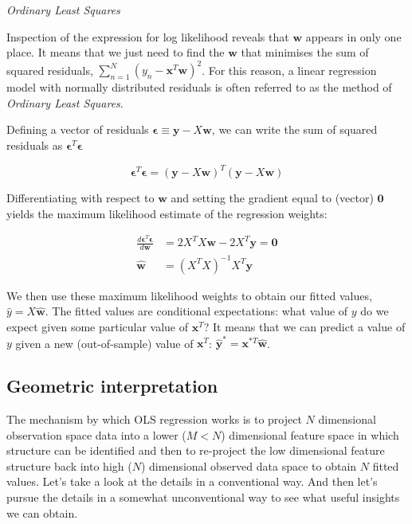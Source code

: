 \documentclass[11pt]{article}
\begin{document}
	\emph{Ordinary Least Squares}
	
	Inspection of the expression for log likelihood reveals that $\boldsymbol{w}$ appears in only one place. It means that we just need to find the $\boldsymbol{w}$ that minimises the sum of squared residuals, $\sum_{n=1}^{N} (y_{n} - \boldsymbol{x}^{T}\boldsymbol{w})^{2}$. For this reason, a linear regression model with normally distributed residuals is often referred to as the method of \emph{Ordinary Least Squares}.
	
	Defining a vector of residuals $\boldsymbol{\epsilon} \equiv \boldsymbol{y} - X\boldsymbol{w}$, we can write the sum of squared residuals as $\boldsymbol{\epsilon}^{T}\boldsymbol{\epsilon}$
	
	\begin{equation*}
		\boldsymbol{\epsilon}^{T}\boldsymbol{\epsilon} = (\boldsymbol{y} - X\boldsymbol{w})^{T}(\boldsymbol{y} - X\boldsymbol{w})
	\end{equation*}
	
	Differentiating with respect to $\boldsymbol{w}$ and setting the gradient equal to (vector) $\boldsymbol{0}$ yields the maximum likelihood estimate of the regression weights:
	
	\begin{align*}
		\frac {d \boldsymbol{\epsilon}^{T}\boldsymbol{\epsilon}}{d\boldsymbol{w}} &= 2X^{T}X\boldsymbol{w} -2X^{T}\boldsymbol{y} = \boldsymbol{0} \\
		\boldsymbol{\hat{w}} &= (X^{T}X)^{-1}X^{T}\boldsymbol{y}
	\end{align*}
	
	We then use these maximum likelihood weights to obtain our fitted values, $\hat{y} = X\boldsymbol{\hat{w}}$. The fitted values are conditional expectations: what value of $y$ do we expect given some particular value of $\boldsymbol{x}^{T}$? It means that we can predict a value of $y$ given a new (out-of-sample) value of $\boldsymbol{x}^{T}$: $\boldsymbol{\hat{y}^{*}} = \boldsymbol{x}^{*T}\boldsymbol{\hat{w}}$.
	
	\subsection{Geometric interpretation}
	
	The mechanism by which OLS regression works is to project $N$ dimensional observation space data into a lower ($M < N$) dimensional feature space in which structure can be identified and then to re-project the low dimensional feature structure back into high ($N$) dimensional observed data space to obtain $N$ fitted values. Let's take a look at the details in a conventional way. And then let's pursue the details in a somewhat unconventional way to see what useful insights we can obtain.
	
\end{document}
